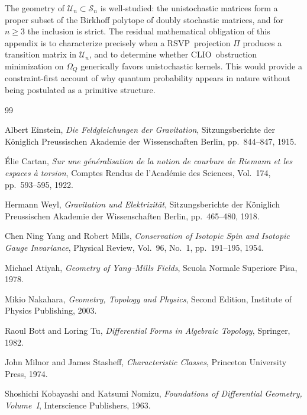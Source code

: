 \documentclass[12pt,a4paper]{article}
\newcommand{\RSVP}{\textrm{RSVP}}
\newcommand{\CLIO}{\textrm{CLIO}}
\begin{document}
The geometry of $\mathcal{U}_n\subset\mathcal{S}_n$ is well-studied: the
unistochastic matrices form a proper subset of the Birkhoff polytope of doubly
stochastic matrices, and for $n\geq 3$ the inclusion is strict. The residual
mathematical obligation of this appendix is to characterize precisely when a
\RSVP\ projection $\Pi$ produces a transition matrix in $\mathcal{U}_n$,
and to determine whether \CLIO\ obstruction minimization on $\Omega_Q$ generically
favors unistochastic kernels. This would provide a constraint-first account of
why quantum probability appears in nature without being postulated as a
primitive structure.

\begin{thebibliography}{99}

Albert Einstein,
\textit{Die Feldgleichungen der Gravitation},
Sitzungsberichte der K\"{o}niglich Preussischen Akademie der Wissenschaften Berlin,
pp.~844--847, 1915.

\'{E}lie Cartan,
\textit{Sur une g\'{e}n\'{e}ralisation de la notion de courbure de Riemann et les espaces \`{a} torsion},
Comptes Rendus de l'Acad\'{e}mie des Sciences,
Vol.~174, pp.~593--595, 1922.

Hermann Weyl,
\textit{Gravitation und Elektrizit\"{a}t},
Sitzungsberichte der K\"{o}niglich Preussischen Akademie der Wissenschaften Berlin,
pp.~465--480, 1918.

Chen Ning Yang and Robert Mills,
\textit{Conservation of Isotopic Spin and Isotopic Gauge Invariance},
Physical Review, Vol.~96, No.~1, pp.~191--195, 1954.

Michael Atiyah,
\textit{Geometry of Yang--Mills Fields},
Scuola Normale Superiore Pisa, 1978.

Mikio Nakahara,
\textit{Geometry, Topology and Physics},
Second Edition, Institute of Physics Publishing, 2003.

Raoul Bott and Loring Tu,
\textit{Differential Forms in Algebraic Topology},
Springer, 1982.

John Milnor and James Stasheff,
\textit{Characteristic Classes},
Princeton University Press, 1974.

Shoshichi Kobayashi and Katsumi Nomizu,
\textit{Foundations of Differential Geometry, Volume~I},
Interscience Publishers, 1963.


\end{thebibliography}
\end{document}
